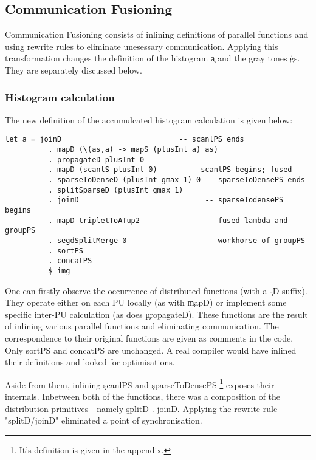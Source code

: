   \subsection{Communication Fusioning}
    
    Communication Fusioning consists of inlining definitions of parallel functions and using rewrite rules to eliminate
    unesessary communication. Applying this transformation changes the definition of the histogram \c{a} and the
    gray tones \c{gs}. They are separately discussed below.
    
    \subsubsection{Histogram calculation}
      The new definition of the accumulcated histogram calculation is given below:
      \begin{lstlisting}
let a = joinD                           -- scanlPS ends
          . mapD (\(as,a) -> mapS (plusInt a) as)
          . propagateD plusInt 0
          . mapD (scanlS plusInt 0)       -- scanlPS begins; fused
          . sparseToDenseD (plusInt gmax 1) 0 -- sparseToDensePS ends
          . splitSparseD (plusInt gmax 1)     
          . joinD                             -- sparseTodensePS begins
          . mapD tripletToATup2               -- fused lambda and groupPS 
          . segdSplitMerge 0                  -- workhorse of groupPS
          . sortPS
          . concatPS
          $ img
      \end{lstlisting}
      One can firstly observe the occurrence of distributed functions (with a \c{-D} suffix). They operate either
      on each PU locally (as with \c{mapD}) or implement some specific inter-PU calculation (as does \c{propagateD}).
      These functions are the result of inlining various parallel functions and eliminating communication.
      The correspondence to their original functions are given as comments in the code. Only sortPS and concatPS
      are unchanged. A real compiler would have inlined their definitions and looked for optimisations.      
      
      Aside from them, inlining \c{scanlPS} and \c{sparseToDensePS}
      \footnote{It's definition is given in the appendix.} exposes their internals.
      Inbetween both of the functions, there was a composition of the distribution primitives - namely \c{splitD . joinD}.
      Applying the rewrite rule "splitD/joinD" eliminated a point of synchronisation.
      
